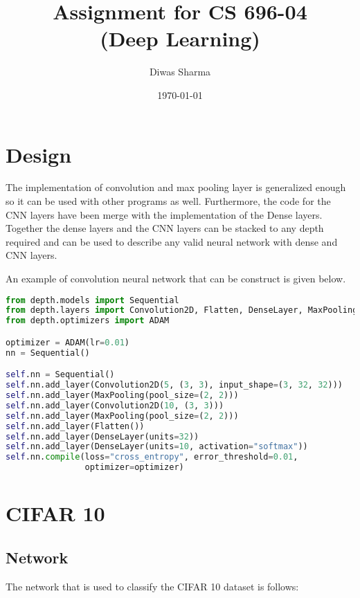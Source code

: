 \documentclass{article}
\title{Assignment for CS 696-04 \\ (Deep Learning)}
\author{Diwas Sharma}
\date{\today}
\begin{document}
\maketitle
\newpage

\section{Design}
The implementation of convolution and max pooling layer is generalized enough
so it can be used with other programs as well. Furthermore, the code for the
CNN layers have been merge with the implementation of the Dense layers.
Together the dense layers and the CNN layers can be stacked to any depth required
and can be used to describe any valid neural network with dense and CNN layers.

An example of convolution neural network that can be construct is given below.

\begin{lstlisting}[language=python]
from depth.models import Sequential
from depth.layers import Convolution2D, Flatten, DenseLayer, MaxPooling
from depth.optimizers import ADAM

optimizer = ADAM(lr=0.01)
nn = Sequential()

self.nn = Sequential()
self.nn.add_layer(Convolution2D(5, (3, 3), input_shape=(3, 32, 32)))
self.nn.add_layer(MaxPooling(pool_size=(2, 2)))
self.nn.add_layer(Convolution2D(10, (3, 3)))
self.nn.add_layer(MaxPooling(pool_size=(2, 2)))
self.nn.add_layer(Flatten())
self.nn.add_layer(DenseLayer(units=32))
self.nn.add_layer(DenseLayer(units=10, activation="softmax"))
self.nn.compile(loss="cross_entropy", error_threshold=0.01,
                optimizer=optimizer)

\end{lstlisting}

\section{CIFAR 10}
\subsection{Network}
The network that is used to classify the CIFAR 10 dataset is follows:
\end{document}
